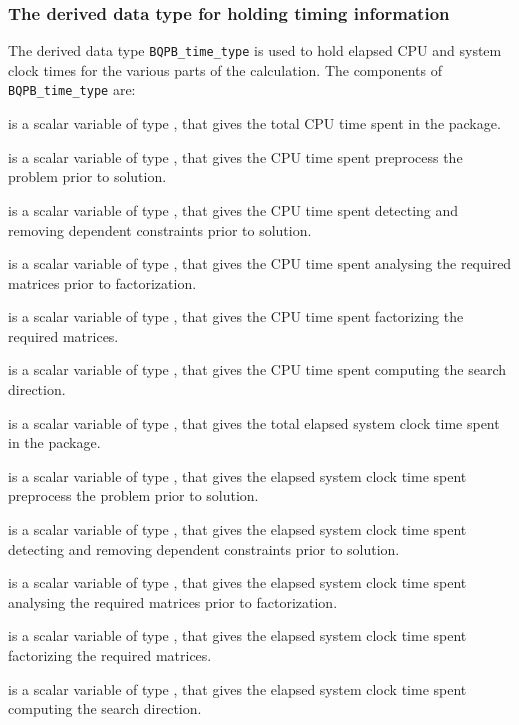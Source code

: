 \documentclass{galahad}
\newcommand{\packagename}{BQPB}
\begin{document}
\subsubsection{The derived data type for holding timing
 information}\label{typetime}
The derived data type
{\tt \packagename\_time\_type}
is used to hold elapsed CPU and system clock times for the various parts of
the calculation. The components of
{\tt \packagename\_time\_type}
are:
\begin{description}
 is a scalar variable of type \realdp, that gives
 the total CPU time spent in the package.

 is a scalar variable of type \realdp, that gives
 the CPU time spent preprocess the problem prior to solution.

 is a scalar variable of type \realdp, that gives
 the CPU time spent detecting and removing dependent constraints prior
to solution.

 is a scalar variable of type \realdp, that gives
 the CPU time spent analysing the required matrices prior to factorization.

 is a scalar variable of type \realdp, that gives
 the CPU time spent factorizing the required matrices.

 is a scalar variable of type \realdp, that gives
 the CPU time spent computing the search direction.

 is a scalar variable of type \realdp, that gives
 the total elapsed system clock time spent in the package.

 is a scalar variable of type \realdp, that gives
 the elapsed system clock time spent preprocess the problem prior to solution.

 is a scalar variable of type \realdp,
that gives  the elapsed system clock time spent detecting and removing
dependent constraints prior to solution.

 is a scalar variable of type \realdp, that gives
 the elapsed system clock time spent analysing the required matrices prior to
factorization.

 is a scalar variable of type \realdp, that gives
 the elapsed system clock time spent factorizing the required matrices.

 is a scalar variable of type \realdp, that gives
 the elapsed system clock time spent computing the search direction.

\end{description}
\end{document}
